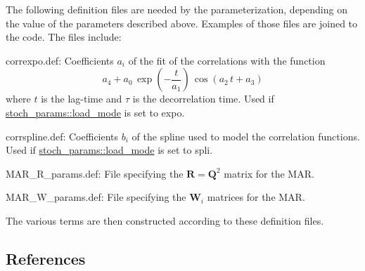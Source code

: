 The following definition files are needed by the parameterization, depending on the value of the parameters described above. Examples of those files are joined to the code. The files include\+:
\begin{DoxyItemize}
\item \textquotesingle{}correxpo.\+def\textquotesingle{}\+: Coefficients $a_i$ of the fit of the correlations with the function \[ a_4+a_0 \, \exp\left(-\frac{t}{a_1}\right) \, \cos(a_2 \, t + a_3) \] where $t$ is the lag-\/time and $\tau$ is the decorrelation time. Used if \hyperlink{namespacestoch__params_ac61a48744a1bb015b5148c421837fbe7}{stoch\+\_\+params\+::load\+\_\+mode} is set to \textquotesingle{}expo\textquotesingle{}.
\item \textquotesingle{}corrspline.\+def\textquotesingle{}\+: Coefficients $b_i$ of the spline used to model the correlation functions. Used if \hyperlink{namespacestoch__params_ac61a48744a1bb015b5148c421837fbe7}{stoch\+\_\+params\+::load\+\_\+mode} is set to \textquotesingle{}spli\textquotesingle{}.
\item \textquotesingle{}M\+A\+R\+\_\+\+R\+\_\+params.\+def\textquotesingle{}\+: File specifying the $\boldsymbol R = \boldsymbol Q^2$ matrix for the M\+AR.
\item \textquotesingle{}M\+A\+R\+\_\+\+W\+\_\+params.\+def\textquotesingle{}\+: File specifying the $\boldsymbol W_i$ matrices for the M\+AR.
\end{DoxyItemize}

The various terms are then constructed according to these definition files. 



\subsection*{References}


